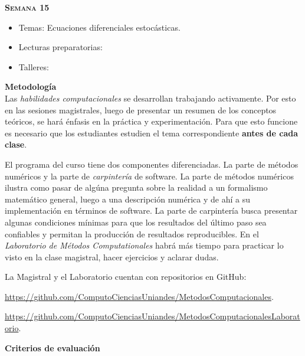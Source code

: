 \documentclass[letterpaper,10pt,onecolumn]{article}
\begin{document}
\noindent\textbf{\textsc{Semana 15}}\\[-0.5cm]
\begin{itemize}
\item Temas: Ecuaciones diferenciales estoc\'asticas. \\[-0.6cm]
\item Lecturas preparatorias: \\[-0.6cm]
\item Talleres: \\[-0.6cm]
\end{itemize}

\noindent\textbf{\large {} \quad
  Metodolog\'ia}\\[-0.2cm] 


\noindent\normalsize 
Las \emph{habilidades computacionales} se desarrollan trabajando activamente. 
Por esto en las sesiones magistrales, luego de presentar un resumen de
los conceptos te\'oricos, se har\'a \'enfasis en la pr\'actica y experimentaci\'on.  
Para que esto funcione es necesario que los estudiantes estudien el
tema correspondiente {\bf antes de cada clase}.

El programa del curso tiene dos componentes diferenciadas. 
La parte de m\'etodos num\'ericos  y la parte de
\emph{carpinter\'ia} de software. 
La parte de m\'etodos num\'ericos ilustra como pasar de alg\'una
pregunta sobre la realidad a un formalismo matem\'atico general, luego
a una descripci\'on num\'erica y de ah\'i a su implementaci\'on en
t\'erminos de software. 
La parte de carpinter\'ia busca presentar algunas condiciones
m\'inimas para que los resultados del \'ultimo paso sea confiables y
permitan la producci\'on de resultados reproducibles.
En el \emph{Laboratorio de M\'etodos
Computationales} habr\'a m\'as tiempo para practicar lo visto en la
clase magistral, hacer ejercicios y aclarar dudas.  



La Magistral y el Laboratorio cuentan con repositorios  en GitHub:

\url{https://github.com/ComputoCienciasUniandes/MetodosComputacionales}. 

\url{https://github.com/ComputoCienciasUniandes/MetodosComputacionalesLaboratorio}. 


\noindent\textbf{\large {} \quad Criterios de
  evaluaci\'on}\\[-0.2cm] 
\end{document}
